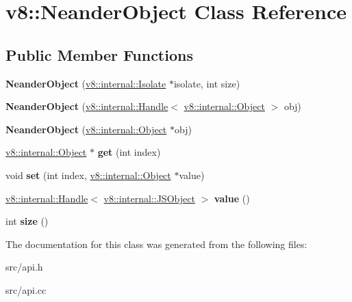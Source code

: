 \hypertarget{classv8_1_1_neander_object}{}\section{v8\+:\+:Neander\+Object Class Reference}
\label{classv8_1_1_neander_object}
\subsection*{Public Member Functions}
\begin{DoxyCompactItemize}
\item 
\hypertarget{classv8_1_1_neander_object_ab43be492a88b997dc95e2172069aaeeb}{}{\bfseries Neander\+Object} (\hyperlink{classv8_1_1internal_1_1_isolate}{v8\+::internal\+::\+Isolate} $\ast$isolate, int size)\label{classv8_1_1_neander_object_ab43be492a88b997dc95e2172069aaeeb}

\item 
\hypertarget{classv8_1_1_neander_object_afb3c7c82a9f93d281468ce7395d7274c}{}{\bfseries Neander\+Object} (\hyperlink{classv8_1_1internal_1_1_handle}{v8\+::internal\+::\+Handle}$<$ \hyperlink{classv8_1_1internal_1_1_object}{v8\+::internal\+::\+Object} $>$ obj)\label{classv8_1_1_neander_object_afb3c7c82a9f93d281468ce7395d7274c}

\item 
\hypertarget{classv8_1_1_neander_object_a93f0c214769d2c36648aa4d1c05394bb}{}{\bfseries Neander\+Object} (\hyperlink{classv8_1_1internal_1_1_object}{v8\+::internal\+::\+Object} $\ast$obj)\label{classv8_1_1_neander_object_a93f0c214769d2c36648aa4d1c05394bb}

\item 
\hypertarget{classv8_1_1_neander_object_a53140b096e48598b3c6b57ead088fc2b}{}\hyperlink{classv8_1_1internal_1_1_object}{v8\+::internal\+::\+Object} $\ast$ {\bfseries get} (int index)\label{classv8_1_1_neander_object_a53140b096e48598b3c6b57ead088fc2b}

\item 
\hypertarget{classv8_1_1_neander_object_adc01a7a561fcd3becf63a02c8c639baa}{}void {\bfseries set} (int index, \hyperlink{classv8_1_1internal_1_1_object}{v8\+::internal\+::\+Object} $\ast$value)\label{classv8_1_1_neander_object_adc01a7a561fcd3becf63a02c8c639baa}

\item 
\hypertarget{classv8_1_1_neander_object_a96e1658babe1cada4a086b2e32d11756}{}\hyperlink{classv8_1_1internal_1_1_handle}{v8\+::internal\+::\+Handle}$<$ \hyperlink{classv8_1_1internal_1_1_j_s_object}{v8\+::internal\+::\+J\+S\+Object} $>$ {\bfseries value} ()\label{classv8_1_1_neander_object_a96e1658babe1cada4a086b2e32d11756}

\item 
\hypertarget{classv8_1_1_neander_object_acb078c5b91fd2f01b8bacf07a098786b}{}int {\bfseries size} ()\label{classv8_1_1_neander_object_acb078c5b91fd2f01b8bacf07a098786b}

\end{DoxyCompactItemize}


The documentation for this class was generated from the following files\+:\begin{DoxyCompactItemize}
\item 
src/api.\+h\item 
src/api.\+cc\end{DoxyCompactItemize}
